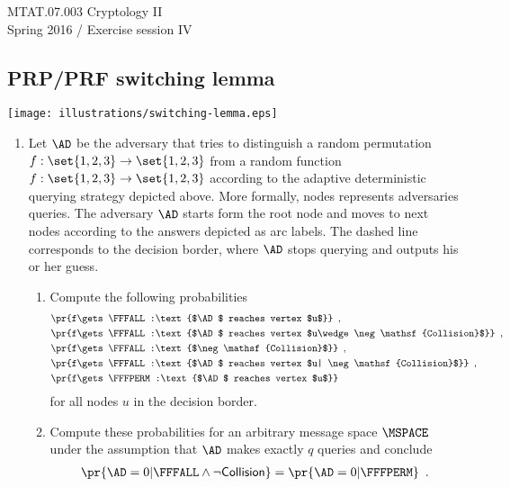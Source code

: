 \documentclass{article}
\begin{document}
\noindent	
MTAT.07.003 Cryptology II\\
Spring 2016 / Exercise session IV 


\subsection*{PRP/PRF switching lemma}

\centerline{ 
  \texttt{[image: illustrations/switching-lemma.eps]}}


\begin{enumerate}

\item Let $\AD$ be the adversary that tries to distinguish a random
  permutation $f:\set{1,2,3}\to\set{1,2,3}$ from a random function
  $f:\set{1,2,3}\to\set{1,2,3}$ according to the adaptive
  deterministic querying strategy depicted above. More formally, nodes
  represents adversaries queries. The adversary $\AD$ starts form the
  root node and moves to next nodes according to the answers depicted
  as arc labels.  The dashed line corresponds to the decision border,
  where $\AD$ stops querying and outputs his or her guess.
  \begin{enumerate}
  \item Compute the following probabilities 
    \begin{align*}
      &\pr{f\gets\FFFALL:\text{$\AD$ reaches vertex $u$}}\enspace,\\
      &\pr{f\gets\FFFALL:\text{$\AD$ reaches vertex $u\wedge \neg\mathsf{Collision}$}}\enspace,\\
      &\pr{f\gets\FFFALL:\text{$\neg\mathsf{Collision}$}}\enspace,\\
      &\pr{f\gets\FFFALL:\text{$\AD$ reaches vertex $u| \neg\mathsf{Collision}$}}\enspace,\\
      &\pr{f\gets\FFFPERM:\text{$\AD$ reaches vertex $u$}}
    \end{align*}
    for all nodes $u$ in the decision border.
  \item Compute these probabilities for an arbitrary message space
    $\MSPACE$ under the assumption that $\AD$ makes exactly $q$
    queries and conclude
    \begin{align*}
      \pr{\AD=0|\FFFALL\wedge\neg\mathsf{Collision}}=\pr{\AD=0|\FFFPERM}\enspace.
    \end{align*}
  \end{enumerate}


\end{enumerate}
\end{document}
